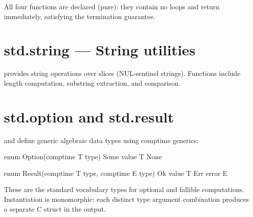 \pnum
All four functions are declared  (pure): they contain no loops and
return immediately, satisfying the termination guarantee.

\section{std.string --- String utilities}
\label{sec:stdlib-string}

\pnum
{} provides string operations over  slices
(NUL-sentinel strings).  Functions include length computation, substring
extraction, and comparison.

\section{std.option and std.result}
\label{sec:stdlib-option-result}

\pnum
{} and  define generic algebraic
data types using comptime generics:

\begin{laincode}
enum Option(comptime T type) {
    Some { value T }
    None
}

enum Result(comptime T type, comptime E type) {
    Ok  { value T }
    Err { error E }
}
\end{laincode}

\pnum
These are the standard vocabulary types for optional and fallible computations.
Instantiation is monomorphic: each distinct type argument combination produces a
separate C struct in the output.
